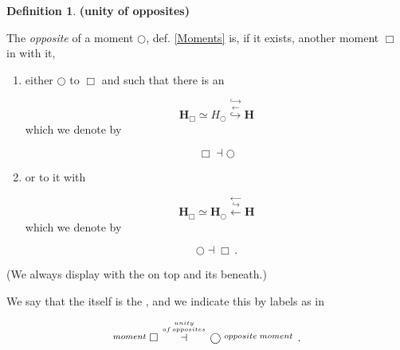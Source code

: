 \documentclass[12pt,titlepage]{article}
\theoremstyle{plain}
\theoremstyle{definition}
\newtheorem{defn}{Definition}
\theoremstyle{remark}
\begin{document}
\begin{defn}
\label{UnityOfOpposites}\hypertarget{UnityOfOpposites}{}
\textbf{(unity of opposites)}

The \emph{opposite} of a moment $\bigcirc$, def. \ref{Moments} is, if it exists, another moment $\Box$ in  with it,

\begin{enumerate}%
\item either $\bigcirc$  to $\Box$ and such that there is an 

\begin{displaymath}
\mathbf{H}_{\Box}\simeq H_{\bigcirc}
  \stackrel{\hookrightarrow}{\stackrel{\longleftarrow}{\hookrightarrow}}
  \mathbf{H}
\end{displaymath}
which we denote by

\begin{displaymath}
\Box \dashv \bigcirc
\end{displaymath}

\item or  to it with

\begin{displaymath}
\mathbf{H}_{\Box}\simeq \mathbf{H}_{\bigcirc}
  \stackrel{\longleftarrow}{\stackrel{\hookrightarrow}{\longleftarrow}}
  \mathbf{H}
\end{displaymath}
which we denote by

\begin{displaymath}
\bigcirc \dashv \Box
  \,.
\end{displaymath}


\end{enumerate}
(We always display  with the  on top and its  beneath.)

We say that the  itself is the , and we indicate this by labels as in

\begin{displaymath}
\stackrel{moment}{} \Box \stackrel{unity \atop {of\,opposites}}{\dashv} \bigcirc \stackrel{opposite\;moment}{}
  \,.
\end{displaymath}
\end{defn}
\end{document}
